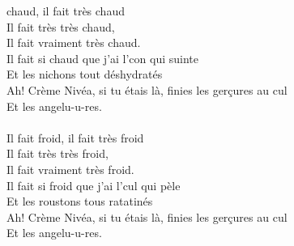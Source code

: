 
 chaud, il fait très chaud
\\Il fait très très chaud,
\\Il fait vraiment très chaud.
\\Il fait si chaud que j'ai l'con qui suinte
\\Et les nichons tout déshydratés
\\Ah! Crème Nivéa, si tu étais là, finies les gerçures au cul
\\Et les angelu-u-res.
\\\\Il fait froid, il fait très froid
\\Il fait très très froid,
\\Il fait vraiment très froid.
\\Il fait si froid que j'ai l'cul qui pèle
\\Et les roustons tous ratatinés
\\Ah! Crème Nivéa, si tu étais là, finies les gerçures au cul
\\Et les angelu-u-res.
\\

\breakpage